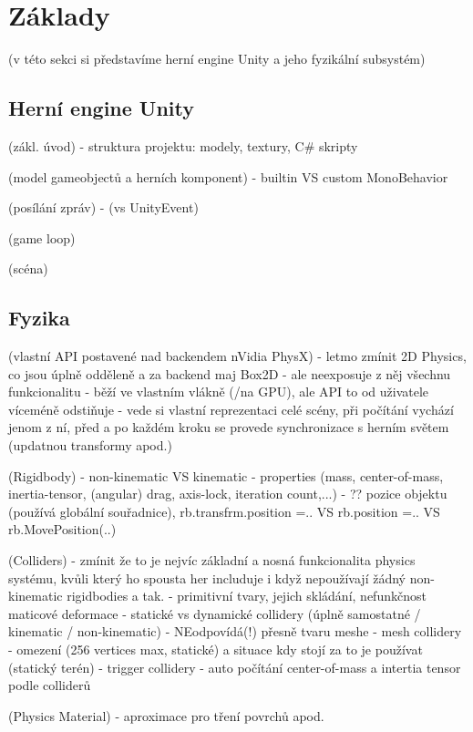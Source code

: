 \chapter{Základy}
(v této sekci si představíme herní engine Unity a jeho fyzikální subsystém)

\section{Herní engine Unity}

(zákl. úvod)
- struktura projektu: modely, textury, C\# skripty

(model gameobjectů a herních komponent)
- builtin VS custom MonoBehavior

(posílání zpráv)
- (vs UnityEvent)

(game loop)

(scéna)



\section{Fyzika}

(vlastní API postavené nad backendem nVidia PhysX)
- letmo zmínit 2D Physics, co jsou úplně odděleně a za backend maj Box2D 
- ale neexposuje z něj všechnu funkcionalitu
- běží ve vlastním vlákně (/na GPU), ale API to od uživatele víceméně odstiňuje
- vede si vlastní reprezentaci celé scény, při počítání vychází jenom z ní, před a po každém kroku se provede synchronizace s herním světem (updatnou transformy apod.)

(Rigidbody)
- non-kinematic VS kinematic
- properties (mass, center-of-mass, inertia-tensor, (angular) drag, axis-lock, iteration count,...)
- ?? pozice objektu (používá globální souřadnice), rb.transfrm.position =.. VS rb.position =.. VS rb.MovePosition(..)

(Colliders)
- zmínit že to je nejvíc základní a nosná funkcionalita physics systému, kvůli který ho spousta her includuje i když nepoužívají žádný non-kinematic rigidbodies a tak.  
- primitivní tvary, jejich skládání, nefunkčnost maticové deformace
- statické vs dynamické collidery (úplně samostatné / kinematic / non-kinematic)
- NEodpovídá(!) přesně tvaru meshe
- mesh collidery - omezení (256 vertices max, statické) a situace kdy stojí za to je používat (statický terén)
- trigger collidery
- auto počítání center-of-mass a intertia tensor podle colliderů

(Physics Material)
- aproximace pro tření povrchů apod.

